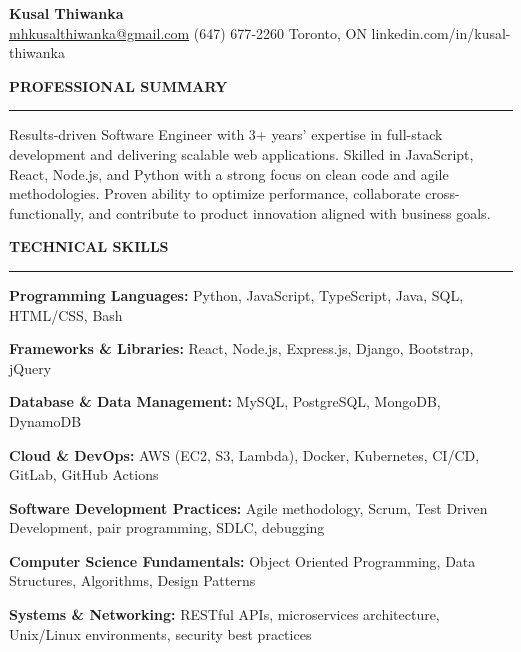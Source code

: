 \documentclass[10pt,letterpaper]{article}
\begin{document}
\begin{center}
{\LARGE\textbf{Kusal Thiwanka}}\\[1pt]
\href{mailto:mhkusalthiwanka@gmail.com}{mhkusalthiwanka@gmail.com}\hspace{2em}%
(647) 677{-}2260\hspace{2em}%
Toronto, ON\hspace{2em}
linkedin.com/in/kusal-thiwanka
\end{center}

\vspace{6pt}

\textbf{PROFESSIONAL SUMMARY}\\[-8pt]
\noindent\rule{\textwidth}{1pt}

\vspace{-2pt}

Results-driven Software Engineer with 3+ years’ expertise in full-stack development and delivering scalable web applications. Skilled in JavaScript, React, Node.js, and Python with a strong focus on clean code and agile methodologies. Proven ability to optimize performance, collaborate cross-functionally, and contribute to product innovation aligned with business goals.

\vspace{3pt}

\textbf{TECHNICAL SKILLS}\\[-8pt]
\noindent\rule{\textwidth}{1pt}

\vspace{-2pt}

\textbf{Programming Languages:} Python, JavaScript, TypeScript, Java, SQL, HTML/CSS, Bash

\textbf{Frameworks \& Libraries:} React, Node.js, Express.js, Django, Bootstrap, jQuery

\textbf{Database \& Data Management:} MySQL, PostgreSQL, MongoDB, DynamoDB

\textbf{Cloud \& DevOps:} AWS (EC2, S3, Lambda), Docker, Kubernetes, CI/CD, GitLab, GitHub Actions

\textbf{Software Development Practices:} Agile methodology, Scrum, Test Driven Development, pair programming, SDLC, debugging

\textbf{Computer Science Fundamentals:} Object Oriented Programming, Data Structures, Algorithms, Design Patterns

\textbf{Systems \& Networking:} RESTful APIs, microservices architecture, Unix/Linux environments, security best practices
\end{document}

